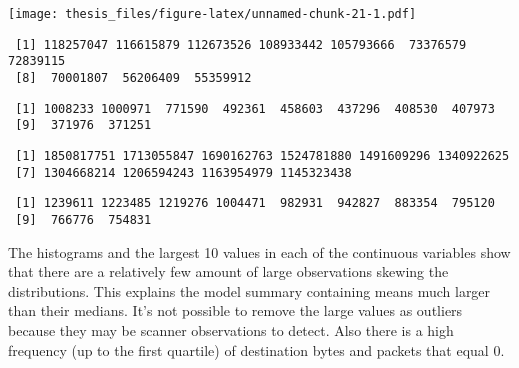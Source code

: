 \documentclass[12pt,twoside]{dukestatscithesis}
\theoremstyle{definition}
\theoremstyle{definition}
\theoremstyle{definition}
\theoremstyle{remark}
\begin{document}
\texttt{[image: thesis\_files/figure-latex/unnamed-chunk-21-1.pdf]}
\begin{verbatim}
 [1] 118257047 116615879 112673526 108933442 105793666  73376579  72839115
 [8]  70001807  56206409  55359912
\end{verbatim}
\begin{verbatim}
 [1] 1008233 1000971  771590  492361  458603  437296  408530  407973
 [9]  371976  371251
\end{verbatim}
\begin{verbatim}
 [1] 1850817751 1713055847 1690162763 1524781880 1491609296 1340922625
 [7] 1304668214 1206594243 1163954979 1145323438
\end{verbatim}
\begin{verbatim}
 [1] 1239611 1223485 1219276 1004471  982931  942827  883354  795120
 [9]  766776  754831
\end{verbatim}
The histograms and the largest 10 values in each of the continuous
variables show that there are a relatively few amount of large
observations skewing the distributions. This explains the model summary
containing means much larger than their medians. It's not possible to
remove the large values as outliers because they may be scanner
observations to detect. Also there is a high frequency (up to the first
quartile) of destination bytes and packets that equal 0.
\end{document}
